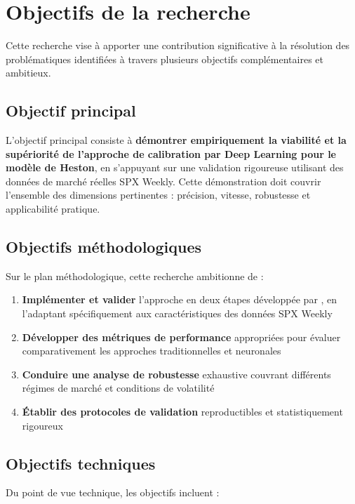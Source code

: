 \section{Objectifs de la recherche}

Cette recherche vise à apporter une contribution significative à la résolution des problématiques identifiées à travers plusieurs objectifs complémentaires et ambitieux.

\subsection{Objectif principal}

L'objectif principal consiste à \textbf{démontrer empiriquement la viabilité et la supériorité de l'approche de calibration par Deep Learning pour le modèle de Heston}, en s'appuyant sur une validation rigoureuse utilisant des données de marché réelles SPX Weekly. Cette démonstration doit couvrir l'ensemble des dimensions pertinentes : précision, vitesse, robustesse et applicabilité pratique.

\subsection{Objectifs méthodologiques}

Sur le plan méthodologique, cette recherche ambitionne de :

\begin{enumerate}
\item \textbf{Implémenter et valider} l'approche en deux étapes développée par \citet{bayer2018deep}, en l'adaptant spécifiquement aux caractéristiques des données SPX Weekly
\item \textbf{Développer des métriques de performance} appropriées pour évaluer comparativement les approches traditionnelles et neuronales
\item \textbf{Conduire une analyse de robustesse} exhaustive couvrant différents régimes de marché et conditions de volatilité
\item \textbf{Établir des protocoles de validation} reproductibles et statistiquement rigoureux
\end{enumerate}

\subsection{Objectifs techniques}

Du point de vue technique, les objectifs incluent :

